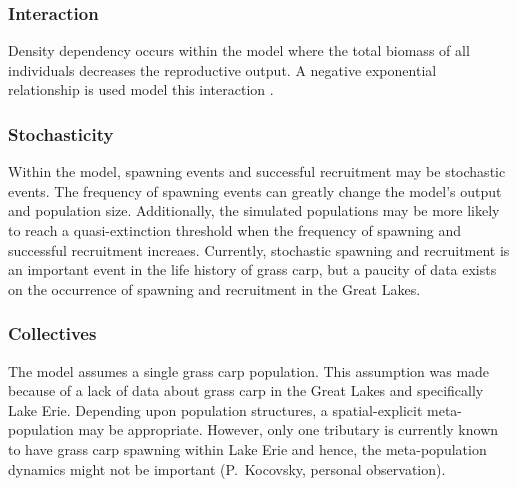 \documentclass{article}[12pt]
\begin{document}
\subsubsection{Interaction}

Density dependency occurs within the model where the total biomass of all individuals decreases the reproductive output.  
A negative exponential relationship is used model this interaction \citep{bolker2008ecological}. 


\subsubsection{Stochasticity}\label{stoc}

Within the model, spawning events and successful recruitment may be stochastic events. 
The frequency of spawning events can greatly change the model's output and population size.
Additionally, the simulated populations may be more likely to reach a quasi-extinction threshold when the frequency of spawning and successful recruitment increaes.
Currently, stochastic spawning and recruitment is an important event in the life history of grass carp, but a paucity of data exists on the occurrence of spawning and recruitment in the Great Lakes. 



\subsubsection{Collectives}

The model assumes a single grass carp population. 
This assumption was made because of a lack of data about grass carp in the Great Lakes and specifically Lake Erie.  
Depending upon population structures, a spatial-explicit meta-population may be appropriate.
However, only one tributary is currently known to have grass carp spawning within Lake Erie and hence, the meta-population dynamics might not be important (P.~Kocovsky, personal observation).  
\end{document}
